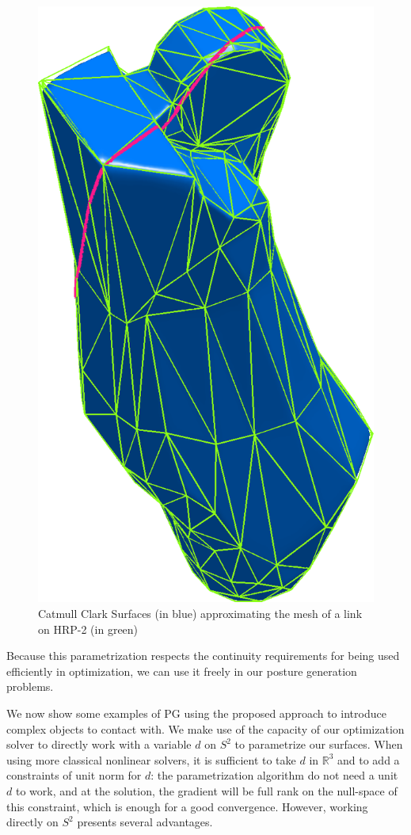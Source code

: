 \begin{figure}
    \includegraphics[width = 0.2\paperwidth]{leg3smoothSharp.png}
\caption{Catmull Clark Surfaces (in blue) approximating the mesh of a link on HRP-2 (in green)}
\label{fig:CCS}
\end{figure}

Because this parametrization respects the continuity requirements for being used efficiently in optimization, we can use it freely in our posture generation problems.

We now show some examples of PG using the proposed approach to introduce complex objects to contact with.
We make use of the capacity of our optimization solver to directly work with a variable $d$ on $S^2$ to parametrize our surfaces.
When using more classical nonlinear solvers, it is sufficient to take $d$ in $\mathbb{R}^3$ and to add a constraints of unit norm for $d$: the parametrization algorithm do not need a unit $d$ to work, and at the solution, the gradient will be full rank on the null-space of this constraint, which is enough for a good convergence.
However, working directly on $S^2$ presents several advantages\cite{brossette:Humanoids:2015}.

